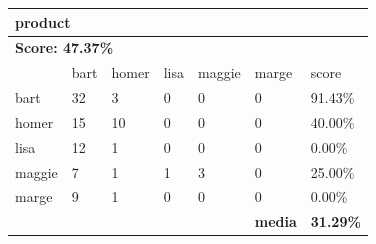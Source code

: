 \documentclass[journal]{IEEEtran}
\begin{document}
\begin{table}[!htb]
\begin{tabular}{l|l|l|l|l|l|l}
\multicolumn{7}{l}{\textbf{product}}                                                        \\ \hline
\multicolumn{7}{l}{\textbf{Score: 47.37\%}}                                                 \\ \hline
          & bart      & homer     & lisa      & maggie    & marge          & score            \\ \hline
bart      & 32        & 3         & 0         & 0         & 0              & 91.43\%          \\ \hline
homer     & 15        & 10        & 0         & 0         & 0              & 40.00\%          \\ \hline
lisa      & 12        & 1         & 0         & 0         & 0              & 0.00\%           \\ \hline
maggie    & 7         & 1         & 1         & 3         & 0              & 25.00\%          \\ \hline
marge     & 9         & 1         & 0         & 0         & 0              & 0.00\%           \\ \hline
\textbf{} & \textbf{} & \textbf{} & \textbf{} & \textbf{} & \textbf{media} & \textbf{31.29\%} \\ \hline
\end{tabular}
\end{table}
\end{document}
